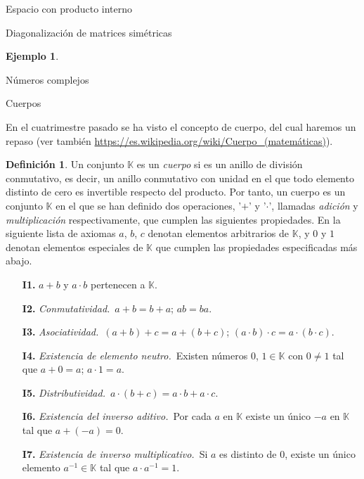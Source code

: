 \documentclass[a4paper,12pt,twoside,spanish]{amsbook}
\theoremstyle{definition}
\newtheorem{definicion}{Definici\'on}[section]
\newtheorem{ejemplo}{Ejemplo}[section]
\theoremstyle{remark}
\newcommand{\K}{\mathbb K}
\begin{document}
\begin{chapter}{Espacio con producto interno}
\begin{section}{Diagonalización de matrices simétricas}
\begin{ejemplo}
	\end{ejemplo}
	
	\end{section}

\end{chapter}



\appendix
\setcounter{chapter}{0}
\renewcommand{\thechapter}{\Alph{chapter}}

\begin{chapter}{Números complejos}\label{chap-num-compl}
	
	\begin{section}{Cuerpos}
		
		En el cuatrimestre pasado se ha visto el concepto de cuerpo, del cual haremos un repaso (ver también  \href{https://es.wikipedia.org/wiki/Cuerpo\_(matemáticas)}{https://es.wikipedia.org/wiki/Cuerpo\_(matemáticas)}).
		
		
		\begin{definicion}
			Un  conjunto $\K$ es un \textit{cuerpo} si es un anillo de división conmutativo, es decir, un anillo conmutativo con unidad en el que todo elemento distinto de cero es invertible respecto del producto. Por tanto,  un cuerpo es un conjunto $\K$ en el que se han definido dos operaciones, '$+$' y '$\cdot$', llamadas \textit{adición} y \textit{multiplicación} respectivamente, que cumplen las siguientes propiedades. En la siguiente lista de axiomas $a$, $b$, $c$ denotan elementos arbitrarios de $\K$, y $0$ y $1$ denotan elementos especiales de $\K$ que cumplen las propiedades especificadas más abajo.
			\begin{enumerate}
				\item[{\bf I1.}] $a+b$ y $a\cdot b$ pertenecen a ${\K}$.
				\item[{\bf I2.}] {\em Conmutatividad.}\, $a+b = b+a$; $ab=ba$. 
				\item[{\bf I3.}] {\em Asociatividad.}\, $(a+b)+c = a+(b+c)$;\; $(a\cdot b)\cdot c = a\cdot (b\cdot c)$. 
				\item[{\bf I4.}] {\em Existencia de elemento neutro.}\, Existen números $0$, $1 \in \K$ con $0\not=1$ tal que $a+0=a$; $a\cdot 1=a$. 
				\item[{\bf I5.}] {\em Distributividad.}\, $a\cdot (b+c)=a\cdot b+a\cdot c$. 
				\item[{\bf I6.}] {\em Existencia del inverso aditivo.}\, Por cada $a$ en ${\K}$ existe un único  $-a$ en ${\K}$ tal que $a+(-a)=0$. 
				\item[{\bf I7.}] {\em Existencia de inverso multiplicativo.}\, Si $a$ es distinto de 0, existe un único elemento $a^{-1} \in \K$  tal que $a\cdot a^{-1}=1$. 
			\end{enumerate}
		\end{definicion}
		

\end{section}
\end{chapter}
\end{document}
